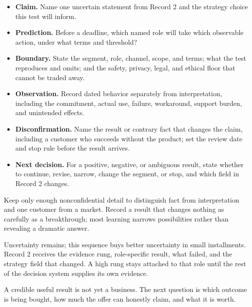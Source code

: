 \begin{itemize}[leftmargin=1.5em,itemsep=0.15em]
\item \textbf{Claim.} Name one uncertain statement from Record 2 and the
  strategy choice this test will inform.
\item \textbf{Prediction.} Before a deadline, which named role will take which
  observable action, under what terms and threshold?
\item \textbf{Boundary.} State the segment, role, channel, scope, and terms;
  what the test reproduces and omits; and the safety, privacy, legal, and
  ethical floor that cannot be traded away.
\item \textbf{Observation.} Record dated behavior separately from
  interpretation, including the commitment, actual use, failure, workaround,
  support burden, and unintended effects.
\item \textbf{Disconfirmation.} Name the result or contrary fact that changes
  the claim, including a customer who succeeds without the product; set the
  review date and stop rule before the result arrives.
\item \textbf{Next decision.} For a positive, negative, or ambiguous result,
  state whether to continue, revise, narrow, change the segment, or stop, and
  which field in Record 2 changes.
\end{itemize}

Keep only enough nonconfidential detail to distinguish fact from interpretation
and one customer from a market. Record a result that changes nothing as
carefully as a breakthrough; most learning narrows possibilities rather than
revealing a dramatic answer.

Uncertainty remains; this sequence buys better uncertainty in small
installments. Record 2 receives the evidence rung, role-specific result, what
failed, and the strategy field that changed. A high rung stays attached to that
role until the rest of the decision system supplies its own evidence.

A credible useful result is not yet a business. The next question is which
outcome is being bought, how much the offer can honestly claim, and what it is
worth.
